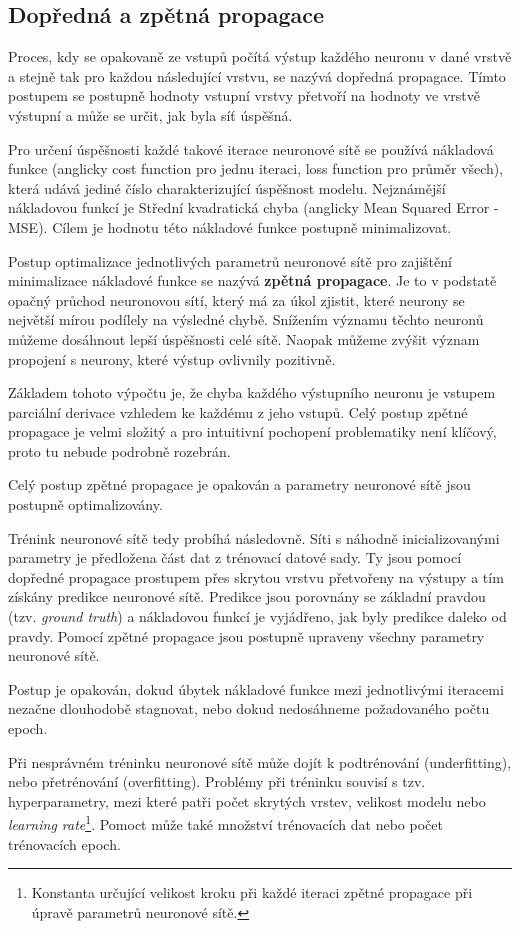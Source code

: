 \subsection{Dopředná a zpětná propagace}
Proces, kdy se opakovaně ze vstupů počítá výstup každého neuronu v dané vrstvě a stejně tak pro každou následující vrstvu, se nazývá dopředná propagace. Tímto postupem se postupně hodnoty vstupní vrstvy přetvoří na hodnoty ve vrstvě výstupní a může se určit, jak byla síť úspěšná.\par
Pro určení úspěšnosti každé takové iterace neuronové sítě se používá nákladová funkce (anglicky cost function pro jednu iteraci, loss function pro průměr všech), která udává jediné číslo charakterizující úspěšnost modelu. Nejznámější nákladovou funkcí je Střední kvadratická chyba (anglicky Mean Squared Error - MSE). Cílem je hodnotu této nákladové funkce postupně minimalizovat.\par \medskip
Postup optimalizace jednotlivých parametrů neuronové sítě pro zajištění minimalizace nákladové funkce se nazývá \textbf{zpětná propagace}. Je to v podstatě opačný průchod neuronovou sítí, který má za úkol zjistit, které neurony se největší mírou podílely na výsledné chybě. Snížením významu těchto neuronů můžeme dosáhnout lepší úspěšnosti celé sítě. Naopak můžeme zvýšit význam propojení s neurony, které výstup ovlivnily pozitivně.\par
Základem tohoto výpočtu je, že chyba každého výstupního neuronu je vstupem parciální derivace vzhledem ke každému z jeho vstupů. Celý postup zpětné propagace je velmi složitý a pro intuitivní pochopení problematiky není klíčový, proto tu nebude podrobně rozebrán.\par
Celý postup zpětné propagace je opakován a parametry neuronové sítě jsou postupně optimalizovány.\par \medskip
Trénink neuronové sítě tedy probíhá následovně. Síti s náhodně inicializovanými parametry je předložena část dat z trénovací datové sady. Ty jsou pomocí dopředné propagace prostupem přes skrytou vrstvu přetvořeny na výstupy a tím získány predikce neuronové sítě. Predikce jsou porovnány se základní pravdou (tzv. \emph{ground truth}) a nákladovou funkcí je vyjádřeno, jak byly predikce daleko od pravdy. Pomocí zpětné propagace jsou postupně upraveny všechny parametry neuronové sítě.\par
Postup je opakován, dokud úbytek nákladové funkce mezi jednotlivými iteracemi nezačne dlouhodobě stagnovat, nebo dokud nedosáhneme požadovaného počtu epoch.\par
Při nesprávném tréninku neuronové sítě může dojít k podtrénování (underfitting), nebo přetrénování (overfitting). Problémy při tréninku souvisí s tzv. hyperparametry, mezi které patři počet skrytých vrstev, velikost modelu nebo \emph{learning rate}\footnote{Konstanta určující velikost kroku při každé iteraci zpětné propagace při úpravě parametrů neuronové sítě.}. Pomoct může také množství trénovacích dat nebo počet trénovacích epoch.

